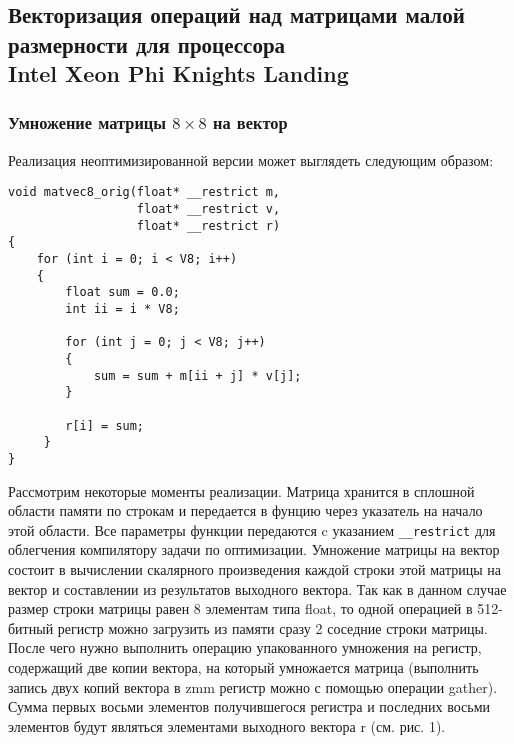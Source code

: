 \subsection{Векторизация операций над матрицами малой размерности для процессора \\ Intel Xeon Phi Knights Landing}

\subsubsection{Умножение матрицы $8 \times 8$ на вектор}

Реализация неоптимизированной версии может выглядеть следующим образом:

\begin{lstlisting}[caption={Невекторизованная версия умножения матрицы размера $8 \times 8$ на вектор},label={lst:text_4_small_matr_8x8_mul_vel_noopt}]
void matvec8_orig(float* __restrict m,
                  float* __restrict v,
                  float* __restrict r)
{
    for (int i = 0; i < V8; i++)
    {
        float sum = 0.0;
        int ii = i * V8;

        for (int j = 0; j < V8; j++)
        {
            sum = sum + m[ii + j] * v[j];
        }

        r[i] = sum;
     }
}
\end{lstlisting}

Рассмотрим некоторые моменты реализации.
Матрица хранится в сплошной области памяти по строкам и передается в фунцию через указатель на начало этой области.
Все параметры функции передаются c указанием \texttt{\_\_restrict} для облегчения компилятору задачи по оптимизации.
Умножение матрицы на вектор состоит в вычислении скалярного произведения каждой строки этой матрицы на вектор и составлении из результатов выходного вектора.
Так как в данном случае размер строки матрицы равен 8 элементам типа float, то одной операцией в 512-битный регистр можно загрузить из памяти сразу 2 соседние строки матрицы.
После чего нужно выполнить операцию упакованного умножения на регистр, содержащий две копии вектора, на который умножается матрица (выполнить запись двух копий вектора в zmm регистр можно с помощью операции gather).
Сумма первых восьми элементов получившегося регистра и последних восьми элементов будут являться элементами выходного вектора r (см. рис. 1).

